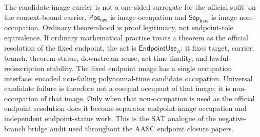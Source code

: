 \documentclass[11pt]{article}
\theoremstyle{definition}
\theoremstyle{remark}
\newcommand{\PosRaw}{\mathsf{Pos}_{\mathsf{raw}}}
\newcommand{\SepBare}{\mathsf{Sep}_{\mathsf{bare}}}
\newcommand{\EndpointUse}{\mathsf{EndpointUse}}
\begin{document}
The candidate-image carrier is not a one-sided surrogate for the official split: on the context-bound carrier, \(\PosRaw\) is image occupation and \(\SepBare\) is image non-occupation. Ordinary theoremhood is proof legitimacy, not endpoint-role equivalence. If ordinary mathematical practice treats a theorem as the official resolution of the fixed endpoint, the act is \(\EndpointUse_R\): it fixes target, carrier, branch, theorem status, downstream reuse, act-time finality, and lawful-redescription stability. The fixed endpoint image has a single occupation interface: encoded non-failing polynomial-time candidate occupation. Universal candidate failure is therefore not a coequal occupant of that image; it is non-occupation of that image. Only when that non-occupation is used as the official endpoint resolution does it become separator endpoint-image occupation and independent endpoint-status work. This is the SAT analogue of the negative-branch bridge audit used throughout the AASC endpoint closure papers.
\end{document}
